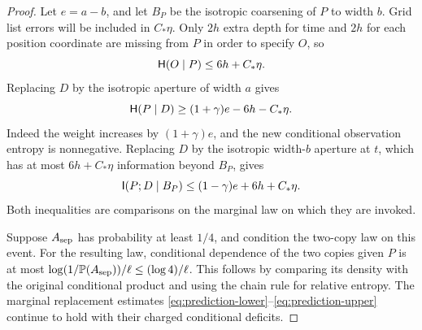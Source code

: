 \begin{proof}
Let \(e=a-b\), and let \(B_P\) be the isotropic coarsening of \(P\)
to width \(b\).  Grid list errors will be included in \(C_*\eta\).
Only \(2h\) extra depth for time and \(2h\) for each position
coordinate are missing from \(P\) in order to specify \(O\), so
\begin{equation}
 \mathsf H(O\mid P)\leq6h+C_*\eta.
 \label{eq:prediction-missing-data}
\end{equation}
Replacing \(D\) by the isotropic aperture of width \(a\) gives
\begin{equation}
 \mathsf H(P\mid D)\geq(1+\gamma)e-6h-C_*\eta.
 \label{eq:prediction-lower}
\end{equation}
Indeed the weight increases by \((1+\gamma)e\), and the new
conditional observation entropy is nonnegative.  Replacing \(D\)
by the isotropic width-\(b\) aperture at \(t\), which has at most
\(6h+C_*\eta\) information beyond \(B_P\), gives
\begin{equation}
 \mathsf I(P;D\mid B_P)\leq(1-\gamma)e+6h+C_*\eta.
 \label{eq:prediction-upper}
\end{equation}
Both inequalities are comparisons on the marginal law on which
they are invoked.

Suppose \(A_{\rm sep}\) has probability at least \(1/4\), and
condition the two-copy law on this event.
For the resulting law, conditional dependence of the two copies
given \(P\) is at most
\(\log(1/\mathbb P(A_{\rm sep}))/\ell\leq(\log4)/\ell\).
This follows by comparing its density with the original conditional
product and using the chain rule for relative entropy.
The marginal replacement estimates
\eqref{eq:prediction-lower}--\eqref{eq:prediction-upper}
continue to hold with their charged conditional deficits.


\end{proof}
